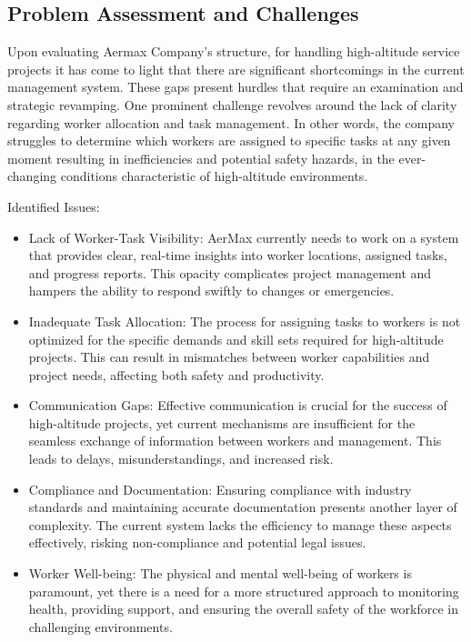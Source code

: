 \subsection{Problem Assessment and Challenges}
Upon evaluating Aermax Company's structure, for handling high-altitude service projects it has come to light that there are significant shortcomings in the current management system. These gaps present hurdles that require an examination and strategic revamping. One prominent challenge revolves around the lack of clarity regarding worker allocation and task management. In other words, the company struggles to determine which workers are assigned to specific tasks at any given moment resulting in inefficiencies and potential safety hazards, in the ever-changing conditions characteristic of high-altitude environments.

Identified Issues:
\begin{itemize}[leftmargin=*]
  \item Lack of Worker-Task Visibility: AerMax currently needs to work on a system that provides clear, real-time insights into worker locations, assigned tasks, and progress reports. This opacity complicates project management and hampers the ability to respond swiftly to changes or emergencies.
  \item Inadequate Task Allocation: The process for assigning tasks to workers is not optimized for the specific demands and skill sets required for high-altitude projects. This can result in mismatches between worker capabilities and project needs, affecting both safety and productivity.
  \item Communication Gaps: Effective communication is crucial for the success of high-altitude projects, yet current mechanisms are insufficient for the seamless exchange of information between workers and management. This leads to delays, misunderstandings, and increased risk.
  \item Compliance and Documentation: Ensuring compliance with industry standards and maintaining accurate documentation presents another layer of complexity. The current system lacks the efficiency to manage these aspects effectively, risking non-compliance and potential legal issues.
  \item Worker Well-being: The physical and mental well-being of workers is paramount, yet there is a need for a more structured approach to monitoring health, providing support, and ensuring the overall safety of the workforce in challenging environments.
\end{itemize}

